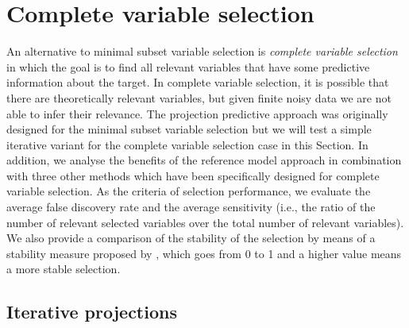 \documentclass[a4]{article}
\theoremstyle{definition}
\begin{document}
\section{Complete variable selection}\label{comparison-complete-subset}
\label{complete-selection}

An alternative to minimal subset variable selection is \emph{complete
  variable selection} in which the goal is to find all relevant
variables that have some predictive information about the target. In
complete variable selection, it is possible that there are theoretically
relevant variables, but given finite noisy data we are not able to infer their relevance.
The projection predictive approach was originally designed for the minimal subset
variable selection but we will test a simple iterative variant for the complete
variable selection case in this Section.
 In addition, we analyse the benefits of the reference
model approach in combination with three other
methods which have been specifically designed for complete variable selection. 
As the criteria of selection performance, we evaluate the average false
discovery rate and the average
sensitivity (i.e., the ratio of the number of relevant selected
variables over the total number of relevant variables). We also provide
a comparison of the stability of the selection by means of a stability
measure proposed by \citet{paper:stability}, which goes from 0 to 1 and a higher value 
means a more stable selection. 

\subsection{Iterative projections}
\end{document}
